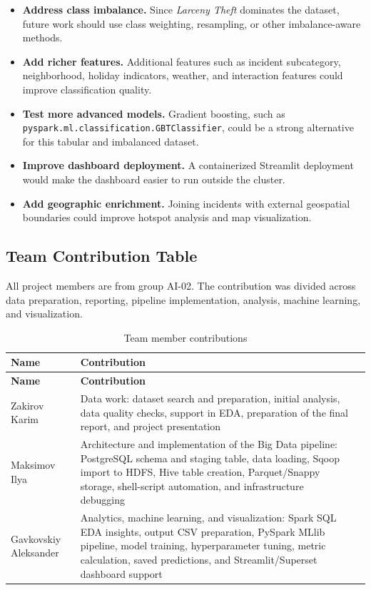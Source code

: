 \documentclass[12pt,a4paper]{article}
\begin{document}
\begin{itemize}
    \item \textbf{Address class imbalance.} Since \textit{Larceny Theft} dominates the dataset, future work should use class weighting, resampling, or other imbalance-aware methods.
    \item \textbf{Add richer features.} Additional features such as incident subcategory, neighborhood, holiday indicators, weather, and interaction features could improve classification quality.
    \item \textbf{Test more advanced models.} Gradient boosting, such as \texttt{pyspark.ml.classification.GBTClassifier}, could be a strong alternative for this tabular and imbalanced dataset.
    \item \textbf{Improve dashboard deployment.} A containerized Streamlit deployment would make the dashboard easier to run outside the cluster.
    \item \textbf{Add geographic enrichment.} Joining incidents with external geospatial boundaries could improve hotspot analysis and map visualization.
\end{itemize}

\subsection{Team Contribution Table}

All project members are from group AI-02. The contribution was divided across data preparation, reporting, pipeline implementation, analysis, machine learning, and visualization.

\begin{longtable}{L{3.7cm} L{10.2cm} L{1.2cm}}
\caption{Team member contributions}\\
\toprule
\textbf{Name} & \textbf{Contribution} & \textbf{} \\
\midrule
\endfirsthead
\toprule
\textbf{Name} & \textbf{Contribution} & \textbf{} \\
\midrule
\endhead
Zakirov Karim & Data work: dataset search and preparation, initial analysis, data quality checks, support in EDA, preparation of the final report, and project presentation & \\
Maksimov Ilya & Architecture and implementation of the Big Data pipeline: PostgreSQL schema and staging table, data loading, Sqoop import to HDFS, Hive table creation, Parquet/Snappy storage, shell-script automation, and infrastructure debugging &  \\
Gavkovskiy Aleksander & Analytics, machine learning, and visualization: Spark SQL EDA insights, output CSV preparation, PySpark MLlib pipeline, model training, hyperparameter tuning, metric calculation, saved predictions, and Streamlit/Superset dashboard support &  \\
\bottomrule
\end{longtable}
\end{document}
